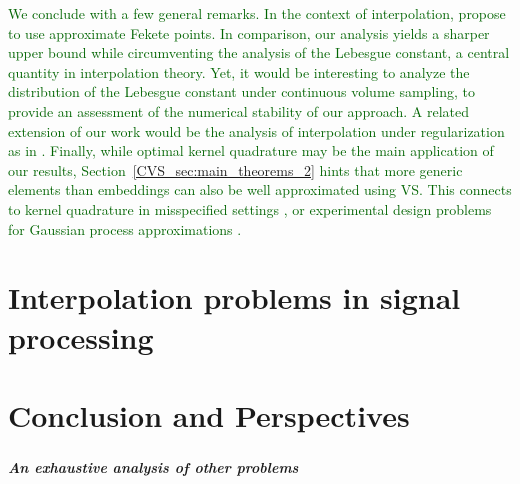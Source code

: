 \documentclass[twoside,11pt]{book}
\newcommand{\rev}[1]{\textcolor{darkgreen}{#1}}
\numberwithin{theorem}{chapter}
\numberwithin{definition}{chapter}
\numberwithin{proposition}{chapter}
\numberwithin{corollary}{chapter}
\numberwithin{example}{chapter}
\numberwithin{lemma}{chapter}
\numberwithin{assumption}{chapter}
\begin{document}
\rev{We conclude with a few general remarks.}
\rev{
In the context of interpolation, \citep{KaSaTa19} propose to use approximate Fekete points. In comparison, our analysis yields a sharper upper bound while circumventing the analysis of the Lebesgue constant, a central quantity in interpolation theory. Yet, it would be interesting to analyze the distribution of the Lebesgue constant under continuous volume sampling, to provide an assessment of the numerical stability of our approach. A related extension of our work would be the analysis of interpolation under regularization as in \citep{Bac17}.
Finally, while optimal kernel quadrature may be the main application of our results, Section~\ref{CVS_sec:main_theorems_2} hints that more generic elements than embeddings can also be well approximated using VS. This connects to kernel quadrature in misspecified settings \citep{KaSrFu16}, or experimental design problems for Gaussian process approximations \citep{WyBrGi20}.
}




\clearpage

\chapter{Interpolation problems in signal processing}\label{chapter:signal_reconstruction}


\chapter{Conclusion and Perspectives}

\paragraph{\Large\selectfont{Conclusion}}

\paragraph{\Large\selectfont{Perspectives}}
\paragraph{An exhaustive analysis of other problems}
\end{document}
